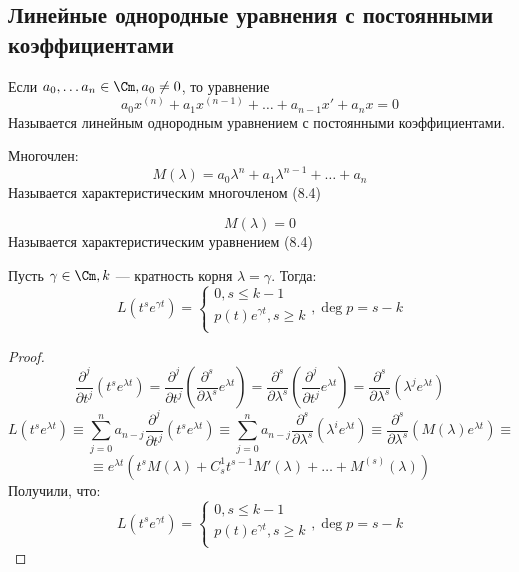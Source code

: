 \subsection{Линейные однородные уравнения с постоянными коэффициентами}

\begin{definition}
    Если \(a_0, \dots a_n \in \Cm, a_0 \ne 0\), то уравнение
    \begin{equation}
        a_0x^{(n)} + a_1x^{(n - 1)} + \dots + a_{n - 1}x' + a_nx = 0
    \end{equation}
    Называется линейным однородным уравнением с постоянными коэффициентами.
\end{definition}

\begin{definition}
    Многочлен:
    \[M(\lambda) = a_0\lambda^n + a_1\lambda^{n - 1} + \dots + a_n\]
    Называется характеристическим многочленом (8.4)
\end{definition}

\begin{definition}
    \begin{equation}
        M(\lambda) = 0
    \end{equation}
    Называется характеристическим уравнением (8.4)
\end{definition}

\begin{lemma}
    Пусть \(\gamma \in \Cm, k\) --- кратность корня \(\lambda = \gamma\). Тогда:
    \[L\left( t^se^{\gamma t} \right) = \left\{\begin{array}{l}
        0, s \le k - 1 \\
        p(t)e^{\gamma t}, s \ge k \\
    \end{array}\right., \deg p = s - k\]
\end{lemma}
\begin{proof}
    \[\frac{\partial^j}{\partial t^j}\left( t^s e^{\lambda t} \right) = \frac{\partial^j}{\partial t^j}\left( \frac{\partial^s}{\partial \lambda^s}e^{\lambda t} \right) = \frac{\partial^s}{\partial \lambda^s}\left( \frac{\partial^j}{\partial t^j}e^{\lambda t} \right) = \frac{\partial^s}{\partial \lambda^s}\left( \lambda^j e^{\lambda t} \right)\]
    \[L\left( t^s e^{\lambda t} \right) \equiv \sum_{j = 0}^n a_{n - j}\frac{\partial^j}{\partial t^j}\left( t^s e^{\lambda t} \right) \equiv \sum_{j = 0}^n a_{n - j}\frac{\partial^s}{\partial \lambda^s}\left( \lambda^i e^{\lambda t} \right) \equiv \frac{\partial^s}{\partial \lambda^s}\left( M(\lambda)e^{\lambda t} \right) \equiv \]
    \[\equiv e^{\lambda t}\left( t^sM(\lambda) + C_s^1t^{s - 1}M'(\lambda) + \dots + M^{(s)}(\lambda) \right)\]
    Получили, что:
    \[L\left( t^se^{\gamma t} \right) = \left\{\begin{array}{l}
        0, s \le k - 1 \\
        p(t)e^{\gamma t}, s \ge k \\
    \end{array}\right., \deg p = s - k\]
\end{proof}

